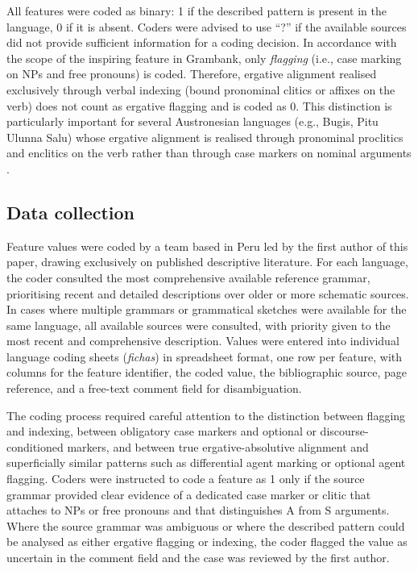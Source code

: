 \documentclass[12pt,a4paper]{article}
\begin{document}
All features were coded as binary: 1 if the described pattern is present in the language, 0 if it is absent. Coders were advised to use ``?'' if the available sources did not provide sufficient information for a coding decision. In accordance with the scope of the inspiring feature in Grambank, only \textit{flagging} (i.e., case marking on NPs and free pronouns) is coded. Therefore, ergative alignment realised exclusively through verbal indexing (bound pronominal clitics or affixes on the verb) does not count as ergative flagging and is coded as 0. This distinction is particularly important for several Austronesian languages (e.g., Bugis, Pitu Ulunna Salu) whose ergative alignment is realised through pronominal proclitics and enclitics on the verb rather than through case markers on nominal arguments \cite{liao2004}.

\subsection{Data collection}

Feature values were coded by a team based in Peru led by the first author of this paper, drawing exclusively on published descriptive literature. For each language, the coder consulted the most comprehensive available reference grammar, prioritising recent and detailed descriptions over older or more schematic sources. In cases where multiple grammars or grammatical sketches were available for the same language, all available sources were consulted, with priority given to the most recent and comprehensive description. Values were entered into individual language coding sheets (\textit{fichas}) in spreadsheet format, one row per feature, with columns for the feature identifier, the coded value, the bibliographic source, page reference, and a free-text comment field for disambiguation.

The coding process required careful attention to the distinction between flagging and indexing, between obligatory case markers and optional or discourse-conditioned markers, and between true ergative-absolutive alignment and superficially similar patterns such as differential agent marking or optional agent flagging. Coders were instructed to code a feature as 1 only if the source grammar provided clear evidence of a dedicated case marker or clitic that attaches to NPs or free pronouns and that distinguishes A from S arguments. Where the source grammar was ambiguous or where the described pattern could be analysed as either ergative flagging or indexing, the coder flagged the value as uncertain in the comment field and the case was reviewed by the first author.
\end{document}
